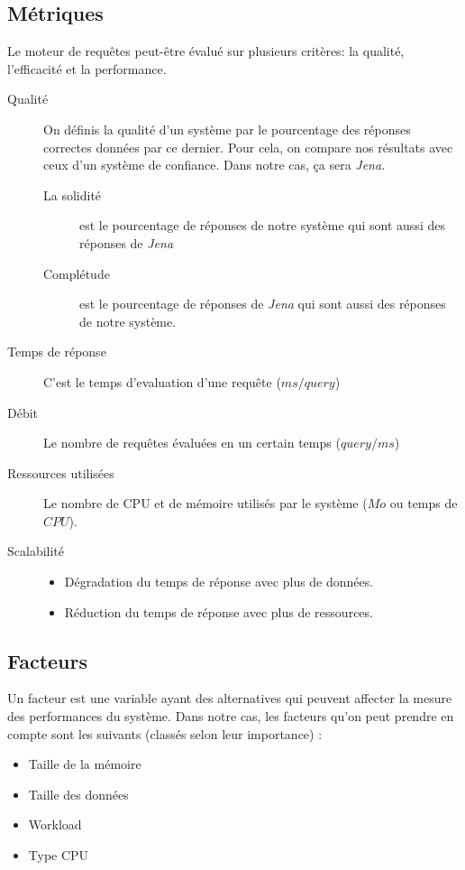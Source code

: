\documentclass[12pt,titlepage]{article}
\begin{document}
\subsection{Métriques}

Le moteur de requêtes peut-être évalué sur plusieurs critères: la qualité, l'efficacité et la performance. 


\begin{description}
  \item[Qualité] On définis la qualité d'un système par le pourcentage des réponses correctes données par ce dernier. Pour cela, on compare nos résultats avec ceux d'un système de confiance. Dans notre cas, ça sera \textit{Jena}.

  \begin{description}
    \item[La solidité] est le pourcentage de réponses de notre système qui sont aussi des réponses de \textit{Jena}
    \item[Complétude] est le pourcentage de réponses de \textit{Jena} qui sont aussi des réponses de notre système.
  \end{description}

  \item[Temps de réponse] C'est le temps d'evaluation d'une requête ($ms / query$)
  \item[Débit] Le nombre de requêtes évaluées en un certain temps ($query / ms$)
  \item[Ressources utilisées] Le nombre de CPU et de mémoire utilisés par le système ($Mo$ ou temps de $CPU$).
  \item[Scalabilité]
  \begin{itemize}
    \item Dégradation du temps de réponse avec plus de données.
    \item Réduction du temps de réponse avec plus de ressources.
  \end{itemize}
\end{description}

\subsection{Facteurs}

Un facteur est une variable ayant des alternatives qui peuvent affecter la mesure des performances du système. Dans notre cas, les facteurs qu'on peut prendre en compte sont les suivants (classés selon leur importance) :

\begin{itemize}
  \item Taille de la mémoire
  \item Taille des données
  \item Workload
  \item Type CPU
\end{itemize}
\end{document}
